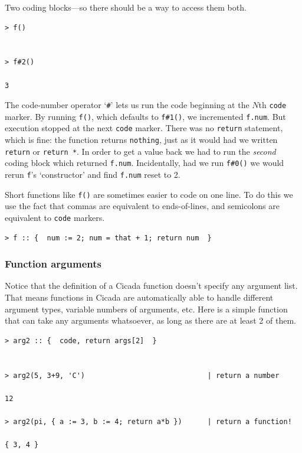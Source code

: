 \documentclass{article}
\newenvironment{code}{
       \begin{list}{}{
               \setlength{\leftmargin}{.4in}
               \setlength{\rightmargin}{0in}
               \setlength{\topsep}{.2in}
       }
       \small
       \item[] }
       { \end{list}   }
\begin{document}
\noindent Two coding blocks---so there should be a way to access them both.

\begin{code} \begin{verbatim}
> f()


> f#2()

3
\end{verbatim} \end{code}

\noindent The code-number operator `\verb$#$' lets us run the code beginning at the $N$th \verb#code# marker.  By running \verb$f()$, which defaults to \verb$f#1()$, we incremented \verb#f.num#.  But execution stopped at the next \verb#code# marker.  There was no \verb#return# statement, which is fine:  the function returns \verb#nothing#, just as it would had we written \verb#return# or \verb#return *#.  In order to get a value back we had to run the \emph{second} coding block which returned \verb#f.num#.  Incidentally, had we run \verb$f#0()$ we would rerun \verb#f#'s `constructor' and find \verb#f.num# reset to 2.

Short functions like \verb#f()# are sometimes easier to code on one line.  To do this we use the fact that commas are equivalent to ends-of-lines, and semicolons are equivalent to \verb#code# markers.

\begin{code} \begin{verbatim}
> f :: {  num := 2; num = that + 1; return num  }
\end{verbatim} \end{code}








\subsubsection{Function arguments} 

Notice that the definition of a Cicada function doesn't specify any argument list.  That means functions in Cicada are automatically able to handle different argument types, variable numbers of arguments, etc.  Here is a simple function that can take any arguments whatsoever, as long as there are at least 2 of them.

\begin{code} \begin{verbatim}
> arg2 :: {  code, return args[2]  }


> arg2(5, 3+9, 'C')                             | return a number

12

> arg2(pi, { a := 3, b := 4; return a*b })      | return a function! 

{ 3, 4 }
\end{verbatim} \end{code}
\end{document}
